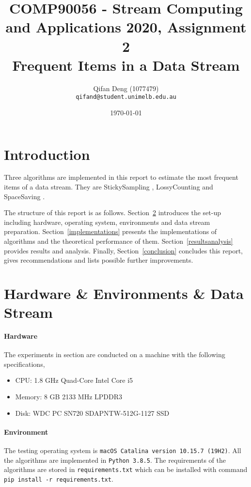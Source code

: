 \documentclass[10pt]{article}
\title{COMP90056 - Stream Computing and Applications 2020, Assignment 2 
\\Frequent Items in a Data Stream}
\author{
  Qifan Deng (1077479)\\
  \texttt{qifand@student.unimelb.edu.au} }
\date{\printdayoff\normalsize\today}
\begin{document}
\sloppy
\maketitle

\section{Introduction}
Three algorithms are implemented in this report to estimate the most frequent items of a data stream.
They are StickySampling \cite{stickylossy}, LossyCounting \cite{stickylossy} and SpaceSaving \cite{spacesaving}. 

The structure of this report is as follows. 
Section~\ref{preparation} introduces the set-up including hardware, operating system, environments 
and data stream preparation.
Section~\ref{implementations} presents the implementations of algorithms 
and the theoretical performance of them.
Section~\ref{resultsanalysis} provides results and analysis. 
Finally, Section~\ref{conclusion} concludes this report,
gives recommendations and lists possible further improvements. 

\section{Hardware \& Environments \& Data Stream}\label{preparation}

\paragraph{Hardware}
The experiments in section are conducted on a machine with the following specifications,
\begin{itemize}
     \setlength\itemsep{1pt}
       \item CPU: 1.8 GHz Quad-Core Intel Core i5
       \item Memory: 8 GB 2133 MHz LPDDR3
       \item Disk: WDC PC SN720 SDAPNTW-512G-1127 SSD
\end{itemize}
\paragraph{Environment}
The testing operating system is \texttt{macOS Catalina version 10.15.7 (19H2)}.
All the algorithms are implemented in \texttt{Python 3.8.5}.
The requirements of the algorithms are stored in \texttt{requirements.txt} which can be installed with command \texttt{pip install -r requirements.txt}.
\end{document}
